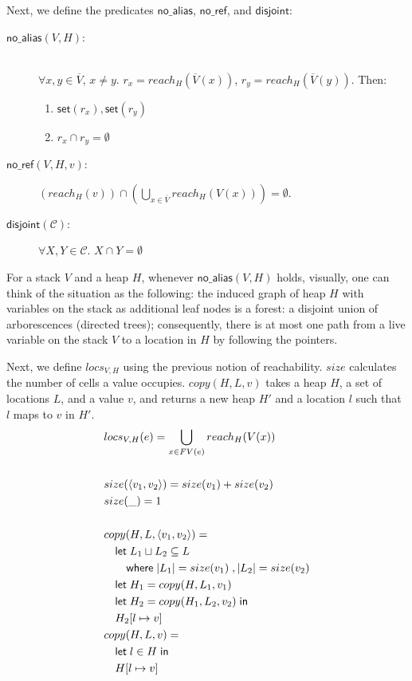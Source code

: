 \documentclass[11pt]{article}
\newcommand{\ms}[1]{\ensuremath{\mathsf{#1}}}
\newcommand{\na}[1]{\mathsf{no\_alias}(#1)}
\newcommand{\dist}[1]{\mathsf{disjoint}(#1)}
\begin{document}
\noindent
Next, we define the predicates $\ms{no\_alias}$, $\ms{no\_ref}$, and $\ms{disjoint}$:
\begin{description}
\item[$\na{V,H}$: ] \\
$\forall x,y \in \overline V$, $x \ne y$.  $r_x = reach_H(\overline V(x))$, $r_y = reach_H(\overline V(y))$. Then:
\begin{enumerate}[(1)]
\item $\ms{set}(r_x), \ms{set}(r_y)$
\item $r_x \cap r_y = \emptyset$
\end{enumerate}
\item[$\ms{no\_ref}(V,H,v)$: ] $(reach_{H}(v)) \cap (\bigcup_{x \in \overline V} reach_{H}(V(x))) = \emptyset$.
\item[$\dist{\mathcal{C}}$: ] $\forall X,Y \in \mathcal{C}$. $X \cap Y = \emptyset$ 
\end{description}

For a stack $V$ and a heap $H$, whenever $\na{V,H}$ holds, visually, one can think of the situation as the following: the induced graph of heap $H$ with variables on the stack as additional leaf nodes is a forest: a disjoint union of arborescences (directed trees); consequently, there is at most one path from a live variable on the stack $V$ to a location in $H$ by following the pointers.

Next, we define $locs_{V,H}$ using the previous notion of reachability. $size$ calculates the number of cells a value occupies. $copy(H,L,v)$ takes a heap $H$, a set of locations $L$, and a value $v$, and returns a new heap $H'$ and a location $l$ such that $l$ maps to $v$ in $H'$.
\begin{align*}
  &locs_{V,H}(e) = \bigcup\limits_{x \in FV(e)} reach_H(V(x))\\\\
  &size(\langle v_1, v_2\rangle) = size(v_1) + size(v_2)\\
  &size(\_) = 1\\\\
  &copy(H,L,\langle v_1, v_2\rangle) =\\
  &\quad\mathsf{let }\; L_1 \sqcup L_2 \subseteq L\\
  &\quad\quad\mathsf{ where }\; |L_1| = size(v_1) \;,|L_2| = size(v_2)\\
  &\quad\mathsf{let }\; H_1 = copy(H,L_1,v_1) \\
  &\quad\mathsf{let }\; H_2 = copy(H_1,L_2,v_2) \;\mathsf{in}\\
  &\quad H_2[l \mapsto v]\\
  &copy(H,L,v) =\\
  &\quad\mathsf{let }\; l \in H\; \mathsf{in}\\
  &\quad H[l \mapsto v]\\
\end{align*}
\end{document}
